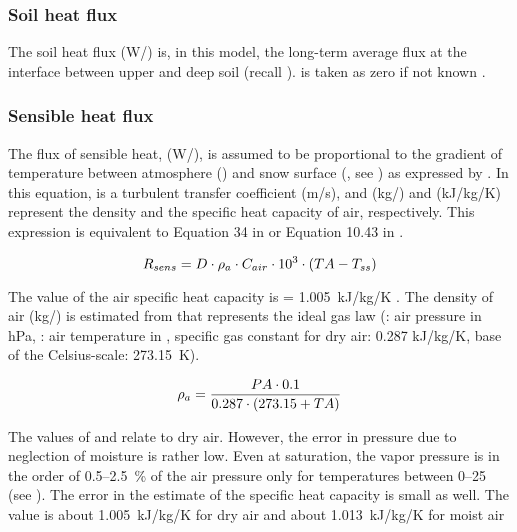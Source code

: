 \subsubsection{Soil heat flux}
The soil heat flux \heatfluxSoil{} (W/\sqm) is, in this model, the long-term average flux at the interface between upper and deep soil (recall ). \heatfluxSoil{} is taken as zero if not known \citep{Tarboton1996}.

\subsubsection{Sensible heat flux} \label{sec:snow-enBal_fluxrates-energy_sensibleHeat}
The flux of sensible heat, \heatfluxSens{} (W/\sqm), is assumed to be proportional to the gradient of temperature between atmosphere (\airtemp) and snow surface (\snowSurfaceTemperature, see ) as expressed by . In this equation, \turbTransCoeff{} is a turbulent transfer coefficient (m/s), and \densityAir{} (kg/\cbm) and \specHeatAir{} (kJ/kg/K) represent the density and the specific heat capacity of air, respectively. This expression is equivalent to Equation 34 in \citet{Tarboton1996} or Equation 10.43 in \citet{Dyck1995}.

\begin{equation} \label{eqn:snow-enBal_heatfluxSens}
  R_{sens} = D \cdot \rho_{a} \cdot C_{air} \cdot 10^3 \cdot (TA- T_{ss})
\end{equation}

The value of the air specific heat capacity is \specHeatAir= 1.005~kJ/kg/K \citep{Tarboton1996}. The density of air \densityAir{} (kg/\cbm) is estimated from  \citep[see Equation 4.9 in][]{Dyck1995} that represents the ideal gas law (\airPressure: air pressure in hPa, \airtemp: air temperature in \celsius, specific gas constant for dry air: 0.287 kJ/kg/K, base of the Celsius-scale: 273.15~K).

\begin{equation} \label{eqn:densityAir}
  \rho_{a} = \frac{PA \cdot 0.1}{0.287 \cdot (273.15 + TA)}
\end{equation}

The values of \specHeatAir{} and \densityAir{} relate to dry air. However, the error in pressure due to neglection of moisture is rather low. Even at saturation, the vapor pressure is in the order of 0.5--2.5~\% of the air pressure only for temperatures between 0--25~\celsius{} (see ). The error in the estimate of the specific heat capacity is small as well. The value is about 1.005~kJ/kg/K for dry air \citep{Tarboton1996} and about 1.013~kJ/kg/K for moist air \citep[][page 188, Eqn. 11.15]{Dyck1995}

